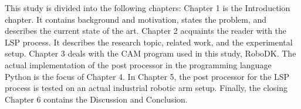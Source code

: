 This study is divided into the following chapters: Chapter 1 is the Introduction chapter. It contains background and motivation, states the problem, and describes the current state of the art.
Chapter 2 acquaints the reader with the LSP process.  It describes the research topic, related work, and the experimental setup. 
Chapter 3 deals with the CAM program used in this study, RoboDK. The actual implementation of the post processor in the programming language Python is the focus of Chapter 4. In Chapter 5, the post processor for the LSP process is tested on an actual industrial robotic arm setup. Finally, the closing Chapter 6 contains the Discussion and Conclusion. 